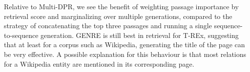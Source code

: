 Relative to Multi-DPR, we see the benefit of weighting passage importance by retrieval score and marginalizing over multiple generations, compared to the strategy of concatenating the top three passages and running a single sequence-to-sequence generation. 
GENRE is still best in retrieval for T-REx, suggesting that at least for a corpus such as Wikipedia, generating the title of the page can be very effective. 
A possible explanation for this behaviour is that most relations for a Wikipedia entity are mentioned in its corresponding page.